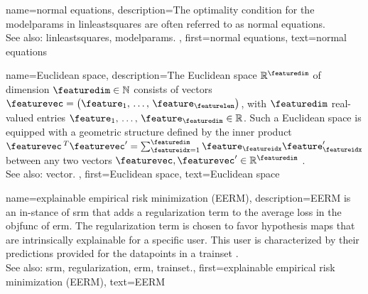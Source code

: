 {name={normal equations}, 
	description={The optimality condition for the \glspl{modelparam} 
	in \gls{linleastsquares} are often referred to as normal equations.\\ 
	See also: \gls{linleastsquares}, \glspl{modelparam}. 
	},
	first={normal equations},
	text={normal equations} 
}


{name={Euclidean space}, 
	description={The 
		Euclidean space $\mathbb{R}^{\featuredim}$ of dimension $\featuredim \in \mathbb{N}$ consists 
		of \glspl{vector} $\featurevec= \big(\feature_{1}, \,\ldots, \,\feature_{\featurelen}\big)$, with $\featuredim$ 
		real-valued entries $\feature_{1}, \,\ldots, \,\feature_{\featuredim} \in \mathbb{R}$. Such a Euclidean 
		space is equipped with a geometric structure defined by the inner product 
		$\featurevec\,^{T} \featurevec' = \sum_{\featureidx=1}^{\featuredim} \feature_{\featureidx} \feature'_{\featureidx}$ 
		between any two \glspl{vector} $\featurevec,\featurevec' \in \mathbb{R}^{\featuredim}$ \cite{RudinBookPrinciplesMatheAnalysis}.
		\\
		See also: \gls{vector}. },
	first={Euclidean space},
	text={Euclidean space} 
}

{name={explainable empirical risk minimization (EERM)}, 
	description={EERM is an 
		in-\linebreak stance of \gls{srm} that adds a \gls{regularization} term to the 
		average \gls{loss} in the \gls{objfunc} of \gls{erm}. 
		The \gls{regularization} term is chosen to favor \gls{hypothesis} \glspl{map} that are intrinsically 
		explainable for a specific user. This user is characterized by their \glspl{prediction} provided 
		for the \glspl{datapoint} in a \gls{trainset} \cite{Zhang:2024aa}.
				\\
		See also: \gls{srm}, \gls{regularization}, \gls{erm}, \gls{trainset}.},
	first={explainable empirical risk minimization (EERM)},
	text={EERM} 
}
	
